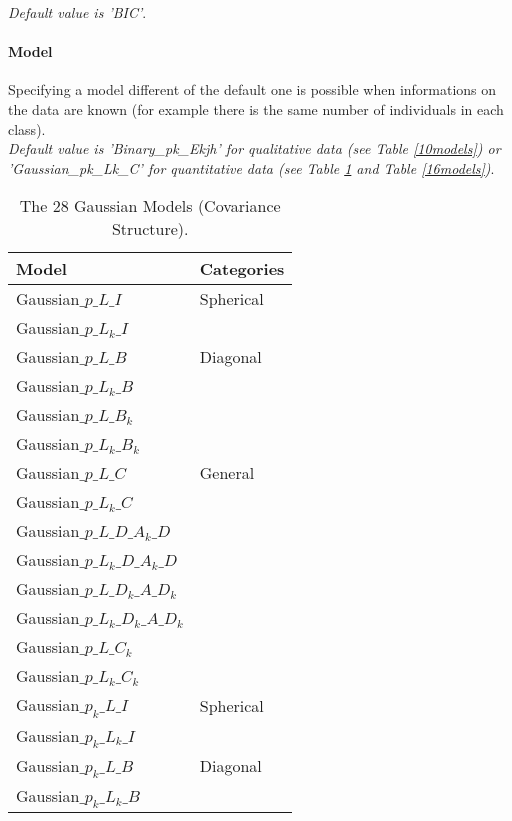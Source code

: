    {\it Default value is 'BIC'}.

 \paragraph{Model}
Specifying a model different of the default one is possible when informations on the data are known
(for example there is the same number of individuals in each class).\\
{\it Default value is 'Binary\_pk\_Ekjh' for qualitative data (see Table \ref{10models})
or 'Gaussian\_pk\_Lk\_C' for quantitative data (see Table \ref{28models} and Table \ref{16models})}.



\begin{table}[!h]
\caption{The 28 Gaussian Models (Covariance Structure).}
{\small
\label{28models}
\begin{center}
\begin{tabular}{|l|l|}
\hline
Model  & Categories \\
\hline
Gaussian$\_p\_L\_I$               & Spherical \\
Gaussian$\_p\_L_k\_I$             &  \\
\hline
Gaussian$\_p\_L\_B$               & Diagonal \\
Gaussian$\_p\_L_k\_B$             & \\
Gaussian$\_p\_L\_B_k$             & \\
Gaussian$\_p\_L_k\_B_k$           & \\
\hline
Gaussian$\_p\_L\_C$               & General \\
Gaussian$\_p\_L_k\_C$             & \\
Gaussian$\_p\_L\_D\_A_k\_D$       & \\
Gaussian$\_p\_L_k\_D\_A_k\_D$     & \\
Gaussian$\_p\_L\_D_k\_A\_D_k$     & \\
Gaussian$\_p\_L_k\_D_k\_A\_D_k$   & \\
Gaussian$\_p\_L\_C_k$             &\\
Gaussian$\_p\_L_k\_C_k$           & \\
\hline
Gaussian$\_p_k\_L\_I$             & Spherical \\
Gaussian$\_p_k\_L_k\_I$           & \\
\hline
Gaussian$\_p_k\_L\_B$             & Diagonal \\
Gaussian$\_p_k\_L_k\_B$           & \\

\end{tabular}
\end{center}}
\end{table}
